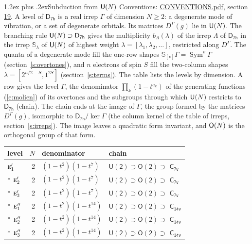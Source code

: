 \documentclass[10pt,a4paper]{article}
\makeatletter
\renewcommand\section{\@startsection{section}{1}{\z@}{-3ex plus -1ex minus -.2ex}%
  {1.2ex plus .2ex}{\normalfont\large\sffamily\bfseries\color{parttitle}}}
\numberwithin{equation}{section}
\newcommand{\grp}[1]{\mathsf{#1}}
\newcommand{\irr}[1]{\text{\normalfont\scshape #1}}
\newcommand{\repD}[1]{D^{#1}}
\newcommand{\schur}[1]{\mathbb{S}_{#1}}
\newcommand{\shape}[1]{[#1]}
\makeatother
\begin{document}
\section{Subduction from \texorpdfstring{$\grp{U(\mathnormal{N})}$}{U(N)}}\label{s:unitary}
Conventions: \href{../../CONVENTIONS.pdf}{CONVENTIONS.pdf}, section \href{../../CONVENTIONS.pdf\#conv.19}{19}.
\leavevmode\label{n:local.level.dimension}A level of $\grp{D_{7h}}$ is a real irrep $\Gamma$ of dimension $N \ge 2$: a degenerate mode of vibration, or a set of degenerate orbitals. \label{n:group.unitary}Its matrices $\repD{\Gamma}(g)$ lie in $\grp{U(\mathnormal{N})}$. \label{n:irrep.schur}\label{n:shape.partition}\label{n:local.partition}\label{n:function.multiplicity.unitary}The branching rule $\grp{U(\mathnormal{N})} \supset \grp{D_{7h}}$ gives the multiplicity $b_\Lambda(\lambda)$ of the irrep $\Lambda$ of $\grp{D_{7h}}$ in the irrep $\schur{\lambda}$ of $\grp{U(\mathnormal{N})}$ of highest weight $\lambda = \shape{\lambda_1, \lambda_2, \dots}$, restricted along $\repD{\Gamma}$. \label{n:local.partition.power}\label{n:local.electrons}\label{n:local.spin}The quanta of a degenerate mode fill the one-row shapes $\schur{\shape{v}}\Gamma = \operatorname{Sym}^{v}\Gamma$ (section~\ref{s:overtones}), and $n$ electrons of spin $S$ fill the two-column shapes $\lambda = \shape{2^{n/2-S}, 1^{2S}}$ (section~\ref{s:terms}).
The table lists the levels by dimension. \label{n:head.level}\label{n:head.denominator}\label{n:index.overtone.denominator}\label{n:head.chain}A row gives the level $\Gamma$, the denominator $\prod_k (1 - t^{a_k})$ of the generating functions (\ref{e:molien}) of its overtones and the subgroups through which $\grp{U(\mathnormal{N})}$ restricts to $\grp{D_{7h}}$ (chain). The chain ends at the image of $\Gamma$, the group formed by the matrices $\repD{\Gamma}(g)$, isomorphic to $\grp{D_{7h}}/\ker\Gamma$ (the column kernel of the table of irreps, section~\ref{s:irreps}). The image leaves a quadratic form invariant, and $\grp{O(\mathnormal{N})}$ is the orthogonal group of that form.
{\small\begin{longtable}{@{}lrll@{}}\toprule
level & $N$ & denominator & chain\\\midrule\endhead
\bottomrule\endfoot\endlastfoot
$\irr{e}_{1}'$ & 2 & $(1-t^{2})(1-t^{7})$ & $\grp{U(2)} \supset \grp{O(2)} \supset$ \href{C7v.pdf}{$\grp{C_{7v}}$}\\*
$\irr{e}_{2}'$ & 2 & $(1-t^{2})(1-t^{7})$ & $\grp{U(2)} \supset \grp{O(2)} \supset$ \href{C7v.pdf}{$\grp{C_{7v}}$}\\*
$\irr{e}_{3}'$ & 2 & $(1-t^{2})(1-t^{7})$ & $\grp{U(2)} \supset \grp{O(2)} \supset$ \href{C7v.pdf}{$\grp{C_{7v}}$}\\*
$\irr{e}_{1}''$ & 2 & $(1-t^{2})(1-t^{14})$ & $\grp{U(2)} \supset \grp{O(2)} \supset$ $\grp{C_{14v}}$\\*
$\irr{e}_{2}''$ & 2 & $(1-t^{2})(1-t^{14})$ & $\grp{U(2)} \supset \grp{O(2)} \supset$ $\grp{C_{14v}}$\\*
$\irr{e}_{3}''$ & 2 & $(1-t^{2})(1-t^{14})$ & $\grp{U(2)} \supset \grp{O(2)} \supset$ $\grp{C_{14v}}$\\
\bottomrule\end{longtable}}
\end{document}
